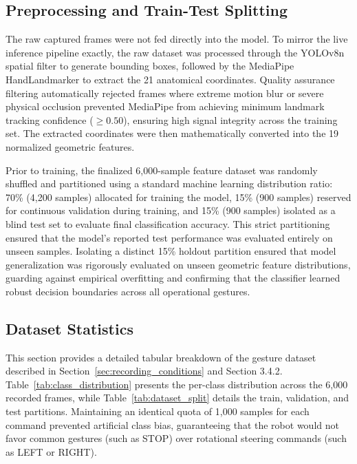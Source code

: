 \subsection{Preprocessing and Train-Test Splitting}
The raw captured frames were not fed directly into the model. To mirror the live inference pipeline exactly, the raw dataset was processed through the YOLOv8n spatial filter to generate bounding boxes, followed by the MediaPipe HandLandmarker to extract the 21 anatomical coordinates. Quality assurance filtering automatically rejected frames where extreme motion blur or severe physical occlusion prevented MediaPipe from achieving minimum landmark tracking confidence ($\ge 0.50$), ensuring high signal integrity across the training set. The extracted coordinates were then mathematically converted into the 19 normalized geometric features.

Prior to training, the finalized 6,000-sample feature dataset was randomly shuffled and partitioned using a standard machine learning distribution ratio: 70\% (4,200 samples) allocated for training the model, 15\% (900 samples) reserved for continuous validation during training, and 15\% (900 samples) isolated as a blind test set to evaluate final classification accuracy. This strict partitioning ensured that the model's reported test performance was evaluated entirely on unseen samples. Isolating a distinct 15\% holdout partition ensured that model generalization was rigorously evaluated on unseen geometric feature distributions, guarding against empirical overfitting and confirming that the classifier learned robust decision boundaries across all operational gestures.

\subsection{Dataset Statistics}
This section provides a detailed tabular breakdown of the gesture dataset described in Section~\ref{sec:recording_conditions} and Section 3.4.2. Table~\ref{tab:class_distribution} presents the per-class distribution across the 6,000 recorded frames, while Table~\ref{tab:dataset_split} details the train, validation, and test partitions. Maintaining an identical quota of 1,000 samples for each command prevented artificial class bias, guaranteeing that the robot would not favor common gestures (such as STOP) over rotational steering commands (such as LEFT or RIGHT).

